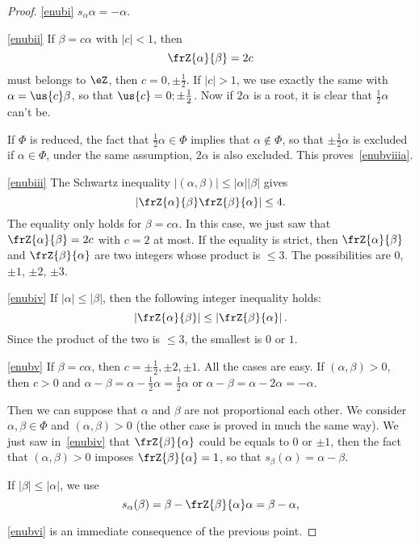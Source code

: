 \begin{proof}
\ref{enubi} $s_{\alpha}\alpha=-\alpha$.

\ref{enubii} If $\beta=c\alpha$ with $|c|<1$, then
\[
\frZ{\alpha}{\beta}=2c
\]
must belongs to $\eZ$, then $c=0,\pm\frac{1}{2}$. If $|c|>1$, we use exactly the same with $\alpha=\us{c}\beta$, so that $\us{c}=0;\pm\frac{1}{2}$. Now if $2\alpha$ is a root, it is clear that $\frac{1}{2}\alpha$ can't be.

If $\Phi$ is reduced, the fact that $\frac{1}{2}\alpha\in\Phi$ implies that $\alpha\notin\Phi$, so that $\pm\frac{1}{2}\alpha$ is excluded if $\alpha\in\Phi$, under the same assumption, $2\alpha$ is also excluded. This proves~\ref{enubviiia}.

\ref{enubiii} The Schwartz inequality $|(\alpha,\beta)|\leq|\alpha||\beta|$ gives
\[
\left|   \frZ{\alpha}{\beta}\frZ{\beta}{\alpha}     \right|\leq 4.
\]
The equality only holds for $\beta=c\alpha$. In this case, we just saw that $\frZ{\alpha}{\beta}=2c$ with $c=2$ at most. If the equality is strict, then $\frZ{\alpha}{\beta}$ and $\frZ{\beta}{\alpha}$ are two integers whose product is $\leq 3$. The possibilities are $0$, $\pm 1$, $\pm 2$, $\pm 3$.

\ref{enubiv} If $|\alpha|\leq|\beta|$, then the following integer inequality holds:
\[
\left|\frZ{\alpha}{\beta}   \right|\leq\left|\frZ{\beta}{\alpha}   \right|.
\]
Since the product of the two  is $\leq 3$, the smallest is $0$ or $1$.

\ref{enubv}
If $\beta=c\alpha$, then $c=\pm\frac{1}{2},\pm 2,\pm 1$. All the cases are easy. If $(\alpha,\beta)>0$, then $c>0$ and $\alpha-\beta= \alpha-\frac{1}{2}\alpha=\frac{1}{2}\alpha$ or $\alpha-\beta=\alpha-2\alpha=-\alpha$.

Then we can suppose that $\alpha$ and $\beta$ are not proportional each other. We consider $\alpha,\beta\in\Phi$ and $(\alpha,\beta)>0$ (the other case is proved in much the same way). We just saw in~\ref{enubiv} that $\frZ{\beta}{\alpha}$ could be equals to $0$ or $\pm 1$, then the fact that $(\alpha,\beta)>0$ imposes $\frZ{\beta}{\alpha}=1$, so that $s_{\beta}(\alpha)=\alpha-\beta$.

If $|\beta|\leq|\alpha|$, we use
\begin{equation}
s_{\alpha}(\beta)=\beta-\frZ{\beta}{\alpha}\alpha
               =\beta-\alpha,
\end{equation}

\ref{enubvi} is an immediate consequence of the previous point.


\end{proof}
